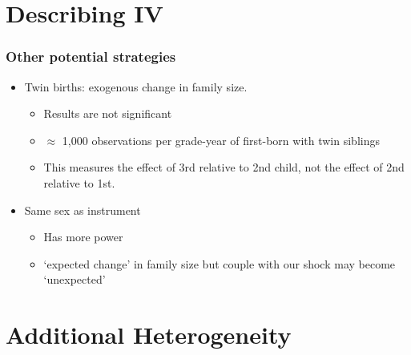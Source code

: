 \documentclass{beamer}
\begin{document}
    \begin{flushleft}
        \hyperlink{frame:pisaclosure}{}
    \end{flushleft}  



\section{Describing IV}

\begin{frame}
    \label{frame:otherstrategies}
    \frametitle{Other potential strategies}
        \begin{itemize}
            \item Twin births: exogenous change in family size.
            \begin{itemize}
                \item Results are not significant
                \item $\approx$ 1,000 observations per grade-year of first-born with twin siblings
                \item This measures the effect of 3rd relative to 2nd child, not the effect of 2nd relative to 1st.
            \end{itemize}
            \item Same sex as instrument
            \begin{itemize}
                \item Has more power
                \item `expected change' in family size but couple with our shock may become `unexpected'
            \end{itemize}
            
        \end{itemize}
     

\end{frame}


\section{Additional Heterogeneity}
\end{document}
